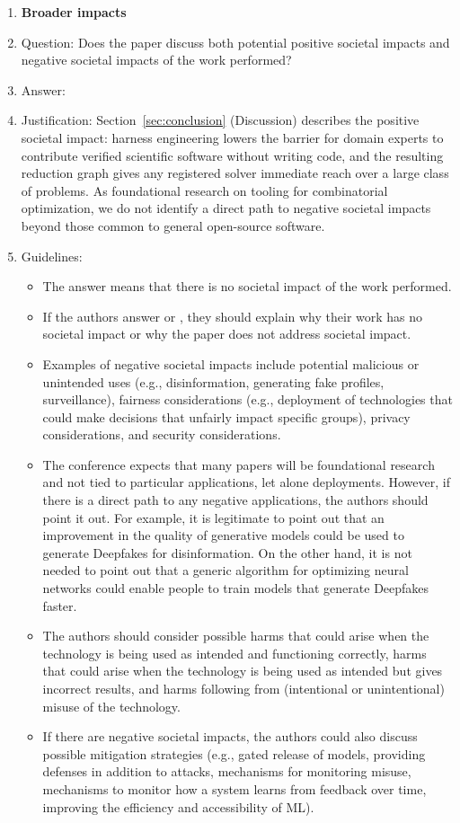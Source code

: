 \begin{enumerate}
\item {\bf Broader impacts}
    \item[] Question: Does the paper discuss both potential positive societal impacts and negative societal impacts of the work performed?
    \item[] Answer: \answerYes{}
    \item[] Justification: Section~\ref{sec:conclusion} (Discussion) describes the positive societal impact: harness engineering lowers the barrier for domain experts to contribute verified scientific software without writing code, and the resulting reduction graph gives any registered solver immediate reach over a large class of problems. As foundational research on tooling for combinatorial optimization, we do not identify a direct path to negative societal impacts beyond those common to general open-source software.
    \item[] Guidelines:
    \begin{itemize}
        \item The answer \answerNA{} means that there is no societal impact of the work performed.
        \item If the authors answer \answerNA{} or \answerNo, they should explain why their work has no societal impact or why the paper does not address societal impact.
        \item Examples of negative societal impacts include potential malicious or unintended uses (e.g., disinformation, generating fake profiles, surveillance), fairness considerations (e.g., deployment of technologies that could make decisions that unfairly impact specific groups), privacy considerations, and security considerations.
        \item The conference expects that many papers will be foundational research and not tied to particular applications, let alone deployments. However, if there is a direct path to any negative applications, the authors should point it out. For example, it is legitimate to point out that an improvement in the quality of generative models could be used to generate Deepfakes for disinformation. On the other hand, it is not needed to point out that a generic algorithm for optimizing neural networks could enable people to train models that generate Deepfakes faster.
        \item The authors should consider possible harms that could arise when the technology is being used as intended and functioning correctly, harms that could arise when the technology is being used as intended but gives incorrect results, and harms following from (intentional or unintentional) misuse of the technology.
        \item If there are negative societal impacts, the authors could also discuss possible mitigation strategies (e.g., gated release of models, providing defenses in addition to attacks, mechanisms for monitoring misuse, mechanisms to monitor how a system learns from feedback over time, improving the efficiency and accessibility of ML).
    \end{itemize}


\end{enumerate}
